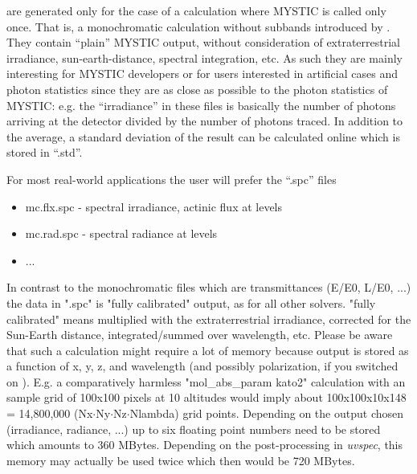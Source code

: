 are generated only for the case of a calculation where MYSTIC is called 
only once. That is, a monochromatic calculation without subbands introduced 
by . They contain ``plain'' MYSTIC output, without
consideration of extraterrestrial irradiance, sun-earth-distance, spectral
integration, etc. As such they are mainly interesting for MYSTIC developers
or for users interested in artificial cases and photon statistics since 
they are as close as possible to the photon statistics of MYSTIC: e.g. 
the ``irradiance'' in these files is basically the number of photons arriving
at the detector divided by the number of photons traced. In addition to the 
average, a standard deviation of the result can be calculated online which is 
stored in ``.std''. 

For most real-world applications the user will prefer the ``.spc'' files

\begin{itemize}
 \item mc.flx.spc - spectral irradiance, actinic flux at levels
 \item mc.rad.spc - spectral radiance at levels
 \item ...
\end{itemize}

In contrast to the monochromatic files which are transmittances (E/E0, L/E0,
...) the data in ".spc" is "fully calibrated" output, as for all other
solvers. "fully calibrated" means multiplied with the extraterrestrial 
irradiance, corrected for the Sun-Earth distance, integrated/summed
over wavelength, etc. Please be aware that such a calculation might require
a lot of memory because output is stored as a function of x, y, z, and
wavelength (and possibly polarization, if you switched on ).
E.g. a comparatively harmless "mol\_abs\_param kato2" calculation with an sample grid of 100x100 pixels
at 10 altitudes would imply about 100x100x10x148 = 14,800,000 (Nx$\cdot$Ny$\cdot$Nz$\cdot$Nlambda) grid points. Depending 
on the output chosen (irradiance, radiance, ...) up to six floating 
point numbers need to be stored which amounts to 360 MBytes. Depending 
on the post-processing in {\sl uvspec}, this memory may actually be used 
twice which then would be 720 MBytes. 

